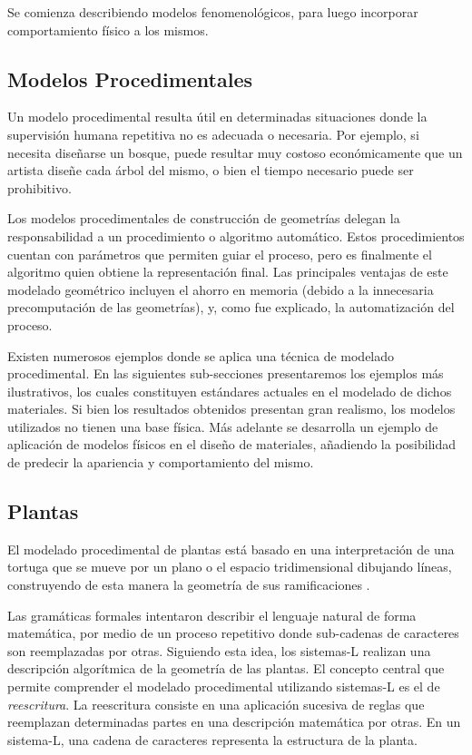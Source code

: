Se comienza describiendo modelos fenomenológicos, para luego incorporar comportamiento físico a los mismos.

\subsection{Modelos Procedimentales}
Un modelo procedimental resulta útil en determinadas situaciones donde la supervisión humana repetitiva no es adecuada o necesaria.
Por ejemplo, si necesita diseñarse un bosque, puede resultar muy costoso económicamente que un artista diseñe cada árbol del mismo, o bien el tiempo necesario puede ser prohibitivo.

Los modelos procedimentales de construcción de geometrías delegan la responsabilidad a un procedimiento o algoritmo automático.
Estos procedimientos cuentan con parámetros que permiten guiar el proceso, pero es finalmente el algoritmo quien obtiene la representación final.
Las principales ventajas de este modelado geométrico incluyen el ahorro en memoria (debido a la innecesaria precomputación de las geometrías), y, como fue explicado, la automatización del proceso.

Existen numerosos ejemplos donde se aplica una técnica de modelado procedimental.
En las siguientes sub-secciones presentaremos los ejemplos más ilustrativos, los cuales constituyen estándares actuales en el modelado de dichos materiales.
Si bien los resultados obtenidos presentan gran realismo, los modelos utilizados no tienen una base física.
Más adelante se desarrolla un ejemplo de aplicación de modelos físicos en el diseño de materiales, añadiendo la posibilidad de predecir la apariencia y comportamiento del mismo.


\subsection{Plantas}
El modelado procedimental de plantas está basado en una interpretación de una tortuga que se mueve por un plano o el espacio tridimensional dibujando líneas, construyendo de esta manera la geometría de sus ramificaciones \cite{Prusinkiewicz1986}.

Las gramáticas formales \cite{Chomsky1956} intentaron describir el lenguaje natural de forma matemática, por medio de un proceso repetitivo donde sub-cadenas de caracteres son reemplazadas por otras.
Siguiendo esta idea, los sistemas-L \cite{Lindenmayer1968} realizan una descripción algorítmica de la geometría de las plantas.
El concepto central que permite comprender el modelado procedimental utilizando sistemas-L es el de {\em reescritura}.
La reescritura consiste en una aplicación sucesiva de reglas que reemplazan determinadas partes en una descripción matemática por otras.
En un sistema-L, una cadena de caracteres representa la estructura de la planta.

